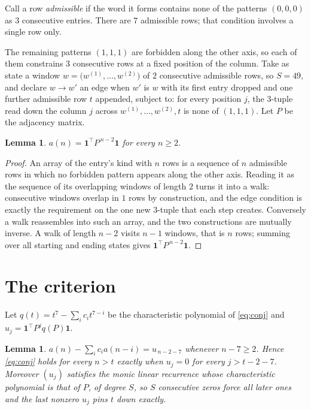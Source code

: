 \documentclass[11pt,a4paper]{article}
\theoremstyle{plain}
\newtheorem{lemma}[theorem]{Lemma}
\theoremstyle{definition}
\begin{document}
Call a row \emph{admissible} if the word it forms contains none of the patterns
$(0,0,0)$ as $3$ consecutive entries. There are $7$ admissible rows; that condition
involves a single row only.

The remaining patterns $(1,1,1)$ are forbidden along the other axis, so each of them
constrains $3$ consecutive rows at a fixed position of the column. Take as state a
window $w=\bigl(w^{(1)},\dots,w^{(2)}\bigr)$ of $2$ consecutive admissible
rows, so $S=49$, and declare $w\to w'$ an edge when $w'$ is $w$ with its first entry
dropped and one further admissible row $t$ appended, subject to: for every position
$j$, the $3$-tuple read down the column $j$ across $w^{(1)},\dots,w^{(2)},t$
is none of $(1,1,1)$. Let $P$ be the adjacency matrix.

\begin{lemma}\label{lem:walk}
$a(n)=\mathbf{1}^{\!\top}P^{\,n-2}\mathbf{1}$ for every $n\ge2$.
\end{lemma}

\begin{proof}
An array of the entry's kind with $n$ rows is a sequence of $n$ admissible rows in
which no forbidden pattern appears along the other axis. Reading it as the sequence of its
overlapping windows of length $2$ turns it into a walk: consecutive windows overlap in
$1$ rows by construction, and the edge condition is exactly the requirement on the one
new $3$-tuple that each step creates. Conversely a walk reassembles into such an array,
and the two constructions are mutually inverse. A walk of length $n-2$ visits $n-1$
windows, that is $n$ rows; summing over all starting and ending states gives
$\mathbf{1}^{\!\top}P^{\,n-2}\mathbf{1}$.
\end{proof}

\section{The criterion}

Let $q(t)=t^{7}-\sum_i c_i t^{7-i}$ be the characteristic polynomial of
\eqref{eq:conj} and $u_j=\mathbf{1}^{\!\top}P^{j}q(P)\mathbf{1}$.

\begin{lemma}\label{lem:crit}
$a(n)-\sum_i c_i a(n-i)=u_{\,n-2-7}$ whenever $n-7\ge2$. Hence
\eqref{eq:conj} holds for every $n>t$ exactly when $u_j=0$ for every
$j>t-2-7$. Moreover $(u_j)$ satisfies the monic linear recurrence whose
characteristic polynomial is that of $P$, of degree $S$, so $S$ consecutive zeros force all
later ones and the last nonzero $u_j$ pins $t$ down exactly.
\end{lemma}
\end{document}
